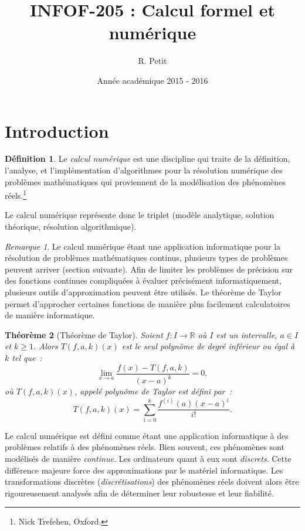 \documentclass{article}
\author{R. Petit}
\date{Année académique 2015 - 2016}
\title{INFOF-205 : Calcul formel et numérique}
\newtheorem{thm}{Théorème}[section]
\theoremstyle{definition}
\newtheorem{déf}[thm]{Définition}
\theoremstyle{remark}
\newtheorem*{rmq}{Remarque}
\newcommand{\R}{\mathbb R}
\begin{document}
\maketitle
\tableofcontents
\newpage
{}

\section{Introduction}
	\begin{déf} Le \emph{calcul numérique} est une discipline qui traite de la définition, l'analyse, et l'implémentation d'algorithmes pour la résolution
	numérique des problèmes mathématiques qui proviennent de la modélisation des phénomènes réels.\footnote{Nick Trefehen, Oxford.}
	\end{déf}

	Le calcul numérique représente donc le triplet (modèle analytique, solution théorique, résolution algorithmique).

	\begin{rmq} Le calcul numérique étant une application informatique pour la résolution de problèmes mathématiques continus, plusieurs types de problèmes
	peuvent arriver (section suivante). Afin de limiter les problèmes de précision sur des fonctions continues compliquées à évaluer précisément informatiquement,
	plusieurs outils d'approximation peuvent être utilisés. Le théorème de Taylor permet d'approcher certaines fonctions de manière plus facilement calculatoires
	de manière informatique.
	\end{rmq}

	\begin{thm}[Théorème de Taylor] Soient $f : I \to \R$ où $I$ est un intervalle, $a \in I$ et $k \geq 1$. Alors $T(f, a, k)(x)$ est le seul polynôme de
	degré inférieur ou égal à $k$ tel que~:
	\[\lim_{x \to a}\frac {f(x)-T(f, a, k)}{(x-a)^k} = 0,\]
	où $T(f, a, k)(x)$, appelé \emph{polynôme de Taylor} est défini par~:
	\[T(f, a, k)(x) = \sum_{i=0}^k\frac {f^{(i)}(a)(x-a)^i}{i!}.\]
	\end{thm}

	Le calcul numérique est défini comme étant une application informatique à des problèmes relatifs à des phénomènes réels. Bien souvent, ces phénomènes
	sont modélisés de manière \emph{continue}. Les ordinateurs quant à eux sont \emph{discrets}. Cette différence majeure force des approximations par le matériel
	informatique. Les transformations discrètes (\emph{discrétisations}) des phénomènes réels doivent alors être rigoureusement analysés afin de déterminer leur
	robustesse et leur fiabilité.
\end{document}
